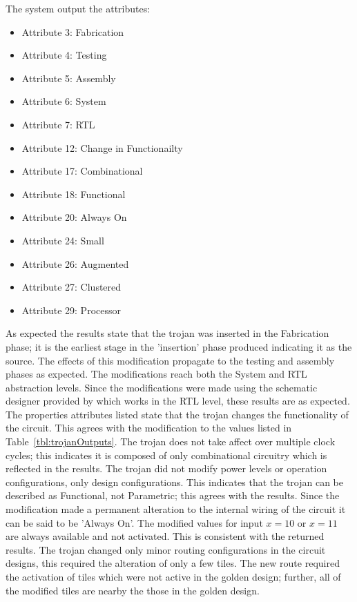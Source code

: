 The system output the attributes:
\begin{itemize}
	\item Attribute 3: Fabrication
	\item Attribute 4: Testing
	\item Attribute 5: Assembly
	\item Attribute 6: System
	\item Attribute 7: RTL
	\item Attribute 12: Change in Functionailty
	\item Attribute 17: Combinational
	\item Attribute 18: Functional
	\item Attribute 20: Always On
	\item Attribute 24: Small
	\item Attribute 26: Augmented
	\item Attribute 27: Clustered
	\item Attribute 29: Processor
\end{itemize}
As expected the results state that the trojan was inserted in the Fabrication phase; it is the earliest stage in the 'insertion' phase produced indicating it as the source.
The effects of this modification propagate to the testing and assembly phases as expected.
The modifications reach both the System and \acrfull{RTL} abstraction levels.
Since the modifications were made using the schematic designer provided by \Xilinx which works in the \acrshort{RTL} level, these results are as expected.
The properties attributes listed state that the trojan changes the functionality of the circuit. 
This agrees with the modification to the values listed in Table~\ref{tbl:trojanOutputs}.
The trojan does not take affect over multiple clock cycles; this indicates it is composed of only combinational circuitry which is reflected in the results.
The trojan did not modify power levels or operation configurations, only design configurations.
This indicates that the trojan can be described as Functional, not Parametric; this agrees with the results.
Since the modification made a permanent alteration to the internal wiring of the circuit it can be said to be 'Always On'.
The modified values for input $x=10$ or $x=11$ are always available and not activated.
This is consistent with the returned results.
The trojan changed only minor routing configurations in the circuit designs, this required the alteration of only a few tiles.
The new route required the activation of tiles which were not active in the \gls{golden} design; further, all of the modified tiles are nearby the those in the \gls{golden} design. 
